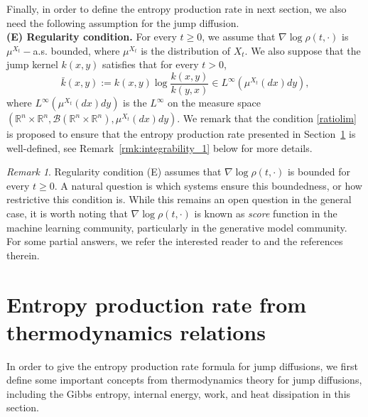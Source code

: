 \documentclass[10pt]{article}
\theoremstyle{definition}
\theoremstyle{remark}
\newtheorem{rem}{Remark}[section]
\numberwithin{equation}{section}
\begin{document}
Finally, in order to define the entropy production rate in next section, we also need the following assumption for the jump diffusion.\\

{\bf (E) Regularity condition.} For every $t \geq 0$, we assume that $\nabla\log \rho(t,\cdot)$ is $\mu^{X_t}-$a.s. bounded, where $\mu^{X_t}$ is the distribution of $X_t$. We also suppose that the jump kernel $k(x,y)$ satisfies that for every $t>0$,
\begin{equation}\label{ratiolim}
    \bar{k}(x,y):= k(x,y)\log \frac{k(x,y)}{k(y,x)} \in L^{\infty}(\mu^{X_t}(dx)dy),
\end{equation}
where $L^{\infty}(\mu^{X_t}(dx)dy)$ is the $L^{\infty}$ on the measure space $(\mathbb{R}^n\times \mathbb{R}^n,\mathscr{B}(\mathbb{R}^n\times \mathbb{R}^n), \mu^{X_t}(dx)dy)$. We remark that the condition \eqref{ratiolim} is proposed to ensure that the entropy production rate presented in Section~\ref{Sec3} is well-defined, see Remark~\ref{rmk:integrability_1} below for more details.
\begin{rem}
    Regularity condition (E) assumes that $\nabla\log \rho(t,\cdot)$ is bounded for every $t \geq 0$. A natural question is which systems ensure this boundedness, or how restrictive this condition is. While this remains an open question in the general case, it is worth noting that $\nabla\log \rho(t,\cdot)$ is known as {\it score} function in the machine learning community, particularly in the generative model community. For some partial answers, we refer the interested reader to \cite{DiffModelBound} and the references therein.
\end{rem}




\section{Entropy production rate from thermodynamics relations}\label{Sec3}

In order to give the entropy production rate formula for jump diffusions, we first define some important concepts from thermodynamics theory for jump diffusions, including the Gibbs entropy, internal energy, work, and heat dissipation in this section.
\end{document}

